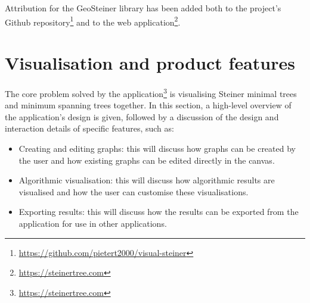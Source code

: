 \documentclass{l4proj}
\begin{document}
Attribution for the GeoSteiner library has been added both to the project's Github repository\footnote{\url{https://github.com/pietert2000/visual-steiner}} and to the web application\footnote{\url{https://steinertree.com}}.


\chapter{Visualisation and product features}
\label{sec:visualisation_and_product_features}
The core problem solved by the application\footnote{\url{https://steinertree.com}} is visualising Steiner minimal trees and minimum spanning trees together.
In this section, a high-level overview of the application's design is given, followed by a discussion of the design and interaction details of specific features, such as:
\begin{itemize}
    \item Creating and editing graphs: this will discuss how graphs can be created by the user and how existing graphs can be edited directly in the canvas.
    \item Algorithmic visualisation: this will discuss how algorithmic results are visualised and how the user can customise these visualisations.
    \item Exporting results: this will discuss how the results can be exported from the application for use in other applications.
\end{itemize}
\end{document}
